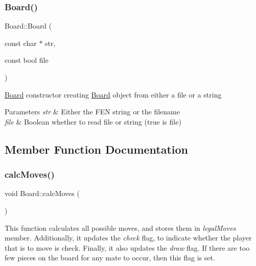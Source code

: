 \subsubsection{\texorpdfstring{Board()}{Board()}\hspace{0.1cm}{\footnotesize\ttfamily [2/2]}}
{\footnotesize\ttfamily Board\+::\+Board (\begin{DoxyParamCaption}\item[{const char $\ast$}]{str,  }\item[{const bool}]{file }\end{DoxyParamCaption})}

\hyperlink{classBoard}{Board} constructor creating \hyperlink{classBoard}{Board} object from either a file or a string 
\begin{DoxyParams}{Parameters}
{\em str} & Either the F\+EN string or the filename \\
\hline
{\em file} & Boolean whether to read file or string (true is file) \\
\hline
\end{DoxyParams}


\subsection{Member Function Documentation}
\mbox{\label{classBoard_ad4d3ebb2342b74d9455a89924a54aa14}} 
\subsubsection{\texorpdfstring{calc\+Moves()}{calcMoves()}}
{\footnotesize\ttfamily void Board\+::calc\+Moves (\begin{DoxyParamCaption}{ }\end{DoxyParamCaption})\hspace{0.3cm}{\ttfamily [private]}}

This function calculates all possible moves, and stores them in {\itshape legal\+Moves} member. Additionally, it updates the {\itshape check} flag, to indicate whether the player that is to move is check. Finally, it also updates the {\itshape draw} flag. If there are too few pieces on the board for any mate to occur, then this flag is set. \mbox{\label{classBoard_ab63f400e8fdd7d1747c18642b59cc435}} 

